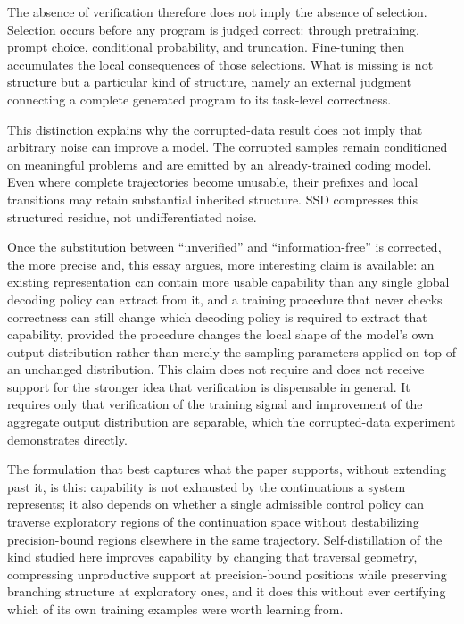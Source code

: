 \documentclass[11pt]{article}
\begin{document}
The absence of verification therefore does not imply the absence of selection. Selection occurs before any program is judged correct: through pretraining, prompt choice, conditional probability, and truncation. Fine-tuning then accumulates the local consequences of those selections. What is missing is not structure but a particular kind of structure, namely an external judgment connecting a complete generated program to its task-level correctness.

This distinction explains why the corrupted-data result does not imply that arbitrary noise can improve a model. The corrupted samples remain conditioned on meaningful problems and are emitted by an already-trained coding model. Even where complete trajectories become unusable, their prefixes and local transitions may retain substantial inherited structure. SSD compresses this structured residue, not undifferentiated noise.

Once the substitution between ``unverified'' and ``information-free'' is corrected, the more precise and, this essay argues, more interesting claim is available: an existing representation can contain more usable capability than any single global decoding policy can extract from it, and a training procedure that never checks correctness can still change which decoding policy is required to extract that capability, provided the procedure changes the local shape of the model's own output distribution rather than merely the sampling parameters applied on top of an unchanged distribution. This claim does not require and does not receive support for the stronger idea that verification is dispensable in general. It requires only that verification of the training signal and improvement of the aggregate output distribution are separable, which the corrupted-data experiment demonstrates directly.

The formulation that best captures what the paper supports, without extending past it, is this: capability is not exhausted by the continuations a system represents; it also depends on whether a single admissible control policy can traverse exploratory regions of the continuation space without destabilizing precision-bound regions elsewhere in the same trajectory. Self-distillation of the kind studied here improves capability by changing that traversal geometry, compressing unproductive support at precision-bound positions while preserving branching structure at exploratory ones, and it does this without ever certifying which of its own training examples were worth learning from.
\end{document}

